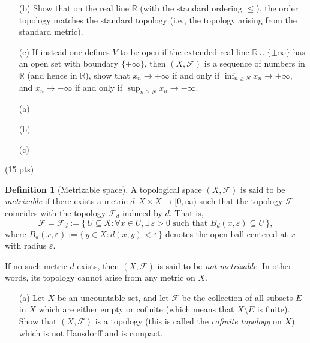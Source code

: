 \documentclass[addpoints]{exam}
\theoremstyle{definition}
\newtheorem*{definition}{Definition}
\begin{document}
\begin{CJK*}{UTF8}{gbsn}
\begin{questions}
\begin{enumerate}
\medskip
\item[(b)] 
Show that on the real line $\mathbb{R}$ (with the standard ordering $\le$), the order topology matches the standard topology (i.e., the topology arising from the standard metric).  

 
 \medskip
\item[(c)] If instead one defines $V$ to be open if the extended real line $\mathbb{R} \cup \{\pm \infty\}$ has an open set with boundary $\{\pm \infty\}$, then $(X, \mathcal{F})$ is a sequence of numbers in $\mathbb{R}$ (and hence in $\mathbb{R}$), show that $x_n \to +\infty$ if and only if $\inf_{n \geq N} x_n \to +\infty$, and $x_n \to -\infty$ if and only if $\sup_{n \geq N} x_n \to -\infty$.

  \end{enumerate}

\begin{solution} 
\begin{enumerate}
\item[(a)] 



\bigskip
\item[(b)] 


\bigskip
\item[(c)] 

\end{enumerate}

 \end{solution}

\question (15 pts) 
\begin{definition}[Metrizable space]\label{def:metrizable}
A topological space $(X,\mathcal{F})$ is said to be \emph{metrizable} if there exists a metric $d : X \times X \to [0,\infty)$ such that the topology $\mathcal{F}$ coincides with the topology $\mathcal{F}_d$ induced by $d$.  
That is,
\[
\mathcal{F} = \mathcal{F}_d := \{\, U \subseteq X : \forall x \in U, \exists\, \varepsilon > 0 \text{ such that } B_d(x,\varepsilon) \subseteq U \,\},
\]
where $B_d(x,\varepsilon) := \{\, y \in X : d(x,y) < \varepsilon \,\}$ denotes the open ball centered at $x$ with radius $\varepsilon$.

\medskip
If no such metric $d$ exists, then $(X,\mathcal{F})$ is said to be \emph{not metrizable}.  
In other words, its topology cannot arise from any metric on $X$.
\end{definition}

\begin{enumerate}
\item[(a)]  Let $X$ be an uncountable set, and let $\mathcal{F}$ be the collection of all subsets $E$ in $X$ which are either empty or cofinite (which means that $X \setminus E$ is finite).  
Show that $(X, \mathcal{F})$ is a topology (this is called the \emph{cofinite topology} on $X$) which is not Hausdorff  and is compact.  


\end{enumerate}
\end{questions}
\end{CJK*}
\end{document}
